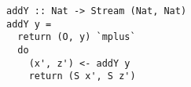 \begin{figure}[!t]
  \centering
  \begin{minipage}{\columnwidth}
    \begin{lstlisting}[label={add_y}, caption={Function for \lstinline{addo out in out} direction}, captionpos=b, frame=tb]
addY :: Nat -> Stream (Nat, Nat)
addY y =
  return (O, y) `mplus`
  do
    (x', z') <- addY y
    return (S x', S z')
    \end{lstlisting}
  \end{minipage}
\end{figure}
